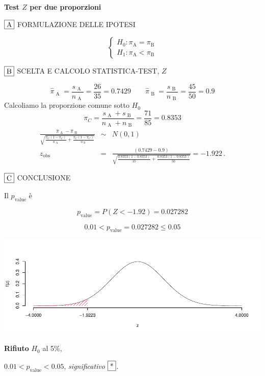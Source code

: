 \documentclass[
  11pt,
]{book}
\theoremstyle{mytheoremstyle}
\theoremstyle{mydefstyle}
\newenvironment{sol}
  {
  \begin{tcolorbox}[enhanced,breakable,arc=0.1mm,boxrule=1pt,colback=white,colframe=iblue,
  title=\bf \fontfamily{lmss}\selectfont \hspace{.5 cm} Soluzione,drop fuzzy shadow]

}{
\end{tcolorbox}
  }
\begin{document}
\begin{sol}
\textbf{Test \(Z\) per due proporzioni}

\(\fbox{A}\) FORMULAZIONE DELLE IPOTESI

\[\begin{cases}
   H_0: \pi_\text{A} = \pi_\text{B} \\
   H_1: \pi_\text{A} < \pi_\text{B} 
   \end{cases}\]

\(\fbox{B}\) SCELTA E CALCOLO STATISTICA-TEST, \(Z\)

\[\hat\pi_\text{ A }=\frac{s_\text{ A }}{n_\text{ A }}=\frac{ 26 }{ 35 }= 0.7429 \qquad
   \hat\pi_\text{ B }=\frac{s_\text{ B }}{n_\text{ B }}=\frac{ 45 }{ 50 }= 0.9 \]Calcoliamo la proporzione comune sotto \(H_0\)
\[
     \pi_C=\frac{s_\text{ A }+s_\text{ B }}{n_\text{ A }+n_\text{ B }}=
     \frac{ 71 }{ 85 }= 0.8353 
   \]\begin{eqnarray*}
   \frac{\hat\pi_\text{ A } - \hat\pi_\text{ B }}
   {\sqrt{\frac {\pi_C(1-\pi_C)}{n_\text{ A }}+\frac {\pi_C(1-\pi_C)}{n_\text{ B }}}}&\sim&N(0,1)\\
   z_{\text{obs}}
   &=& \frac{ ( 0.7429 -  0.9 )} {\sqrt{\frac{ 0.8353 (1- 0.8353 )}{ 35 }+\frac{ 0.8353 (1- 0.8353 )}{ 50 }}}
   =   -1.922 \, .
   \end{eqnarray*}

\(\fbox{C}\) CONCLUSIONE

Il \(p_{\text{value}}\) è

\[ p_{\text{value}} = P(Z<-1.92)=0.027282 \]

\[
 0.01 < p_\text{value}= 0.027282 \leq 0.05 
\]

\begin{center}\includegraphics{Esami_passati_con_soluzioni_files/figure-latex/2023-7,-1} \end{center}

\textbf{Rifiuto} \(H_0\) al 5\%,

\(0.01<p_\text{value}<0.05\), \emph{significativo} \(\fbox{*}\).

\end{sol}
\end{document}
